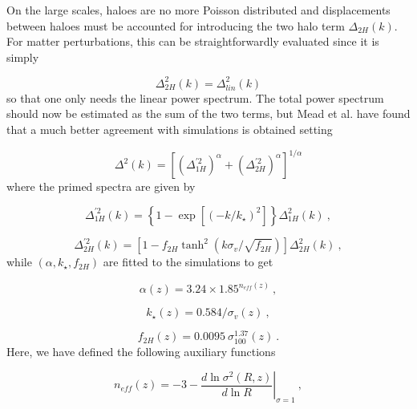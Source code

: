 On the large scales, haloes are no more Poisson distributed and displacements between haloes must be accounted for introducing the two halo term $\Delta_{2H}(k)$. For matter perturbations, this can be straightforwardly evaluated since it is simply

\begin{equation}
\Delta_{2H}^2(k) = \Delta_{lin}^2(k) 
\label{eq: delta2h}
\end{equation}
so that one only needs the linear power spectrum. The total power spectrum should now be estimated as the sum of the two terms, but Mead et al. \cite{Mead15} have found that a much better agreement with simulations is obtained setting

\begin{equation}
\Delta^2(k) = \left [ (\Delta_{1H}^{\prime 2})^\alpha + (\Delta_{2H}^{\prime 2})^\alpha \right ]^{1/\alpha}
\label{eq: enddelta}
\end{equation}
where the primed spectra are given by

\begin{equation}
\Delta_{1H}^{\prime 2}(k) = \left \{ 1 - \exp{[(-k/k_{\star})^2]} \right \} \Delta_{1H}^{2}(k) \ , 
\label{eq: delta1hprime}
\end{equation}

\begin{equation}
\Delta_{2H}^{\prime 2}(k) = \left [ 1 - f_{2H} \tanh^2{(k \sigma_v/\sqrt{f_{2H}})} \right ] \Delta_{2H}^2(k) \ ,
\label{eq: delta2hprime}
\end{equation}
while $(\alpha, k_{\star}, f_{2H})$ are fitted to the simulations to get \cite{Mead16}

\begin{equation}
\alpha(z) = 3.24 \times 1.85^{n_{eff}(z)} \ ,
\label{eq: alpha}
\end{equation}

\begin{equation}
k_{\star}(z) = 0.584/\sigma_v(z) \ , 
\label{eq: kstar}
\end{equation}

\begin{equation}
f_{2H}(z) = 0.0095 \ \sigma_{100}^{1.37}(z) \ .
\label{eq: f2h}
\end{equation} 
Here, we have defined the following auxiliary functions

\begin{equation}
n_{eff}(z) = - 3 - \left . \frac{d\ln{\sigma^2(R, z)}}{d\ln{R}}\right |_{\sigma = 1} \ , 
\label{eq: neff}
\end{equation}

